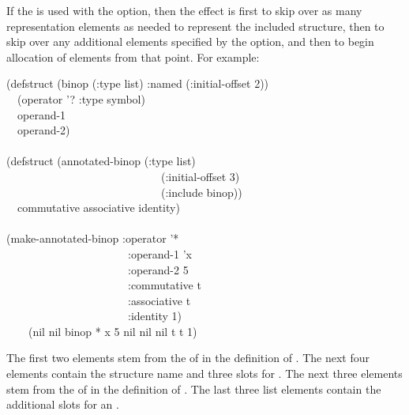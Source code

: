 If the  is used with the 
option, then the effect is first to skip over as many representation
elements as needed to represent the included structure, then to
skip over any additional elements specified by the 
option, and then to begin allocation of elements from that point.
For example:
\begin{lisp}
(defstruct (binop (:type list) :named (:initial-offset 2)) \\
~~(operator '? :type symbol) \\
~~operand-1 \\
~~operand-2) \\
 \\
(defstruct (annotated-binop (:type list) \\
~~~~~~~~~~~~~~~~~~~~~~~~~~~~(:initial-offset 3) \\
~~~~~~~~~~~~~~~~~~~~~~~~~~~~(:include binop)) \\
~~commutative associative identity) \\
 \\
(make-annotated-binop :operator '* \\
~~~~~~~~~~~~~~~~~~~~~~:operand-1 'x \\
~~~~~~~~~~~~~~~~~~~~~~:operand-2 5 \\
~~~~~~~~~~~~~~~~~~~~~~:commutative t \\
~~~~~~~~~~~~~~~~~~~~~~:associative t \\
~~~~~~~~~~~~~~~~~~~~~~:identity 1) \\
~~~\EV\ (nil nil binop * x 5 nil nil nil t t 1)
\end{lisp}
The first two {\nil} elements stem from the  of 
in the definition of .  The next four elements contain the
structure name and three slots for .  The next three {\nil} elements
stem from the  of  in the definition of
.  The last three list elements contain the additional
slots for an .
